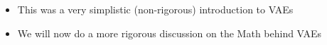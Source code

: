 \documentclass[serif,aspectratio=169,dvipsnames]{beamer}
\begin{document}
\begin{frame}
\begin{columns}
\begin{overlayarea}{\textwidth}{\textheight}
		\end{overlayarea}
		\begin{overlayarea}{\textwidth}{\textheight}
			\begin{itemize}\justifying
 				\item<1-> This was a very simplistic (non-rigorous) introduction to VAEs
 				\item<2-> We will now do a more rigorous discussion on the Math behind VAEs
			\end{itemize}
		\end{overlayarea}
	\end{columns}
\end{frame}
\end{document}
